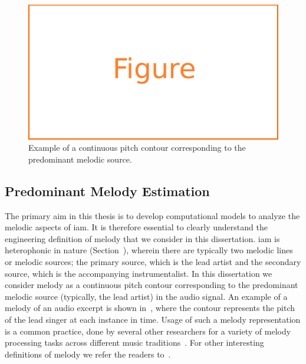 {{\begin{figure}
	\begin{center}
		\includegraphics[width=\figSizeEighty]{ch05_preprocessing/figures/figure_todo.pdf}
	\end{center}
	\caption{Example of a continuous pitch contour corresponding to the predominant melodic source.}
	\label{fig:predominant_melodic_fragment}
\end{figure}


\subsection{Predominant Melody Estimation}
\label{sec:data_preprocessing_predominant_melody_estimation}

The primary aim in this thesis is to develop computational models to analyze the melodic aspects of \gls{iam}. It is therefore essential to clearly understand the engineering definition of melody that we consider in this dissertation. \Gls{iam} is heterophonic in nature (Section~), wherein there are typically two melodic lines or melodic sources; the primary source, which is the lead artist and the secondary source, which is the accompanying instrumentalist. In this dissertation we consider melody as a continuous pitch contour corresponding to the predominant melodic source (typically, the lead artist) in the audio signal. An example of a melody of an audio excerpt is shown in~, where the contour represents the pitch of the lead singer at each instance in time. Usage of such a melody representation is a common practice, done by several other researchers for a variety of melody processing tasks across different music traditions~\citep{Dutta2014,Ishwar2013,Rao2014,koduri2014intonation,senturk2013score,pikrakis2012tracking}.  For other interesting definitions of melody we refer the readers to~\citep{Salamon2012}. 


}}
